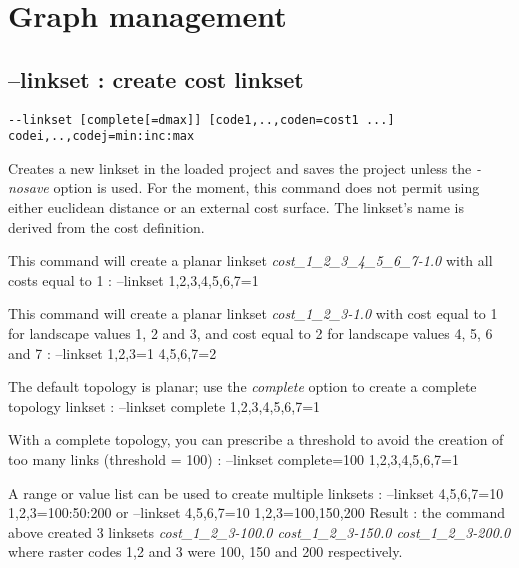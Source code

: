\documentclass[a4paper,10pt]{report}
\newenvironment{cmd}
{\quote\Verbatim}
{\endVerbatim\endquote}
\begin{document}
\section{Graph management}

\subsection{--linkset : create cost linkset}
\begin{verbatim}
--linkset [complete[=dmax]] [code1,..,coden=cost1 ...] codei,..,codej=min:inc:max
\end{verbatim}
Creates a new linkset in the loaded project and saves the project unless the \textit{-nosave} option is used. 
For the moment, this command does not permit using either euclidean distance or an external cost surface.
The linkset's name is derived from the cost definition.

This command will create a planar linkset \textit{cost\_1\_2\_3\_4\_5\_6\_7-1.0} with all costs equal to 1 :
\begin{cmd}
--linkset 1,2,3,4,5,6,7=1
\end{cmd}

This command will create a planar linkset \textit{cost\_1\_2\_3-1.0} with cost equal to 1 for landscape values 1, 2 and 3, and cost equal to 2 for landscape values 4, 5, 6 and 7 :
\begin{cmd}
--linkset 1,2,3=1 4,5,6,7=2
\end{cmd}


The default topology is planar; use the \textit{complete} option to create a complete topology linkset :
\begin{cmd}
--linkset complete 1,2,3,4,5,6,7=1
\end{cmd}

With a complete topology, you can prescribe a threshold to avoid the creation of too many links (threshold = 100) :
\begin{cmd}
--linkset complete=100 1,2,3,4,5,6,7=1
\end{cmd}

A range or value list can be used to create multiple linksets :
\begin{cmd}
--linkset 4,5,6,7=10 1,2,3=100:50:200
or
--linkset 4,5,6,7=10 1,2,3=100,150,200
\end{cmd}
Result : the command above created 3 linksets \textit{cost\_1\_2\_3-100.0 cost\_1\_2\_3-150.0 cost\_1\_2\_3-200.0}
where raster codes 1,2 and 3 were 100, 150 and 200 respectively.
\end{document}
